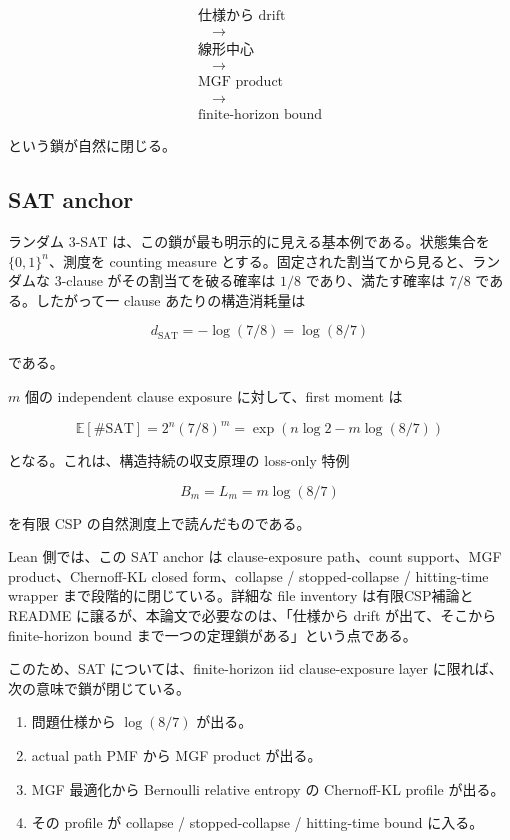 \documentclass[12pt,a4paper]{article}
\begin{document}
\[
\begin{aligned}
\text{仕様から drift} \\
\quad\to\quad \\
\text{線形中心} \\
\quad\to\quad \\
\text{MGF product} \\
\quad\to\quad \\
\text{finite-horizon bound}
\end{aligned}
\]

という鎖が自然に閉じる。

\subsection{SAT anchor}\label{sat-anchor}

ランダム 3-SAT は、この鎖が最も明示的に見える基本例である。状態集合を \(\{0,1\}^n\)、測度を counting measure とする。固定された割当てから見ると、ランダムな 3-clause がその割当てを破る確率は \(1/8\) であり、満たす確率は \(7/8\) である。したがって一 clause あたりの構造消耗量は

\[
d_{\mathrm{SAT}} = -\log(7/8) = \log(8/7)
\]

である。

\(m\) 個の independent clause exposure に対して、first moment は

\[
\mathbb E[\#\mathrm{SAT}] = 2^n(7/8)^m = \exp(n\log 2 - m\log(8/7))
\]

となる。これは、構造持続の収支原理の loss-only 特例

\[
B_{m}=L_{m}=m\log(8/7)
\]

を有限 CSP の自然測度上で読んだものである。

Lean 側では、この SAT anchor は clause-exposure path、count support、MGF product、Chernoff-KL closed form、collapse / stopped-collapse / hitting-time wrapper まで段階的に閉じている。詳細な file inventory は有限CSP補論と README に譲るが、本論文で必要なのは、「仕様から drift が出て、そこから finite-horizon bound まで一つの定理鎖がある」という点である。

このため、SAT については、finite-horizon iid clause-exposure layer に限れば、次の意味で鎖が閉じている。

\begin{enumerate}
\def\labelenumi{\arabic{enumi}.}
\tightlist
\item
  問題仕様から \(\log(8/7)\) が出る。
\item
  actual path PMF から MGF product が出る。
\item
  MGF 最適化から Bernoulli relative entropy の Chernoff-KL profile が出る。
\item
  その profile が collapse / stopped-collapse / hitting-time bound に入る。
\end{enumerate}
\end{document}
